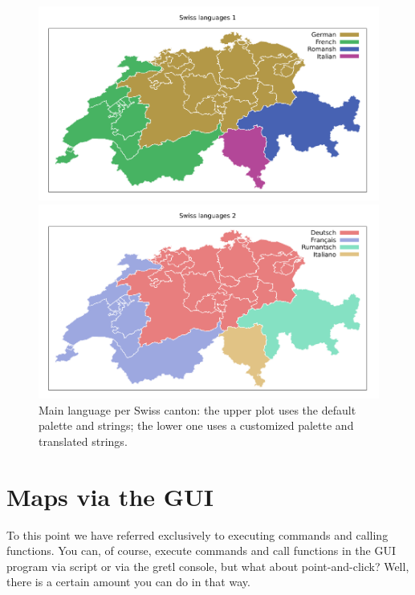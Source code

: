 \documentclass{article}
\begin{document}
\begin{figure}[p]
  \begin{center}
  \includegraphics[scale=0.9]{swiss_langs1.pdf}

  \includegraphics[scale=0.9]{swiss_langs2.pdf}
\end{center}
\caption{Main language per Swiss canton: the upper plot uses the
  default palette and strings; the lower one uses a customized palette
  and translated strings.}
\label{fig:swiss}
\end{figure}

\section{Maps via the GUI}
\label{sec:gui}

To this point we have referred exclusively to executing commands and
calling functions. You can, of course, execute commands and call
functions in the GUI program via script or via the gretl console, but
what about point-and-click? Well, there is a certain amount you can do
in that way.
\end{document}
